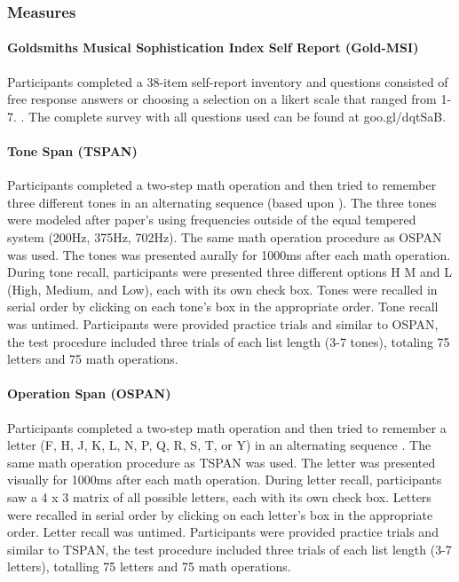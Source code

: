 \documentclass[]{book}
\let\oldparagraph\paragraph
\renewcommand{\paragraph}[1]{\oldparagraph{#1}\mbox{}}
\begin{document}
\hypertarget{measures}{%
\subsubsection{Measures}\label{measures}}

\hypertarget{goldsmiths-musical-sophistication-index-self-report-gold-msi}{%
\paragraph{Goldsmiths Musical Sophistication Index Self Report (Gold-MSI)}\label{goldsmiths-musical-sophistication-index-self-report-gold-msi}}

Participants completed a 38-item self-report inventory and questions consisted of free response answers or choosing a
selection on a likert scale that ranged from 1-7. \citep{mullensiefenMusicalityNonMusiciansIndex2014}.
The complete survey with all questions used can be found at goo.gl/dqtSaB.

\hypertarget{tone-span-tspan}{%
\paragraph{Tone Span (TSPAN)}\label{tone-span-tspan}}

Participants completed a two-step math operation and then tried to remember three different tones in an alternating sequence (based upon \citet{unsworthAutomatedVersionOperation2005}).
The three tones were modeled after \citet{liEstimatingWorkingMemory2013} paper's using frequencies outside of the equal tempered system (200Hz, 375Hz, 702Hz).
The same math operation procedure as OSPAN was used.
The tones was presented aurally for 1000ms after each math operation.
During tone recall, participants were presented three different options H M and L (High, Medium, and Low), each with its own check box.
Tones were recalled in serial order by clicking on each tone's box in the appropriate order.
Tone recall was untimed.
Participants were provided practice trials and similar to OSPAN, the test procedure included three trials of each list length (3-7 tones), totaling 75 letters and 75 math operations.

\hypertarget{operation-span-ospan}{%
\paragraph{Operation Span (OSPAN)}\label{operation-span-ospan}}

Participants completed a two-step math operation and then tried to remember a letter (F, H, J, K, L, N, P, Q, R, S, T, or
Y) in an alternating sequence \citep{unsworthAutomatedVersionOperation2005}.
The same math operation procedure as TSPAN was used.
The letter was presented visually for 1000ms after each math
operation.
During letter recall, participants saw a 4 x 3 matrix of all possible letters, each with its own check box.
Letters were recalled in serial order by clicking on each letter's box in the appropriate order.
Letter recall was untimed.
Participants were provided practice trials and similar to TSPAN, the test procedure included three trials of each list length (3-7 letters), totalling 75 letters and 75 math operations.
\end{document}
